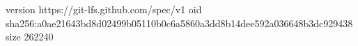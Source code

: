 version https://git-lfs.github.com/spec/v1
oid sha256:a0ae21643bd8d02499b05110b0c6a5860a3dd8b14dee592a036648b3dc929438
size 262240
